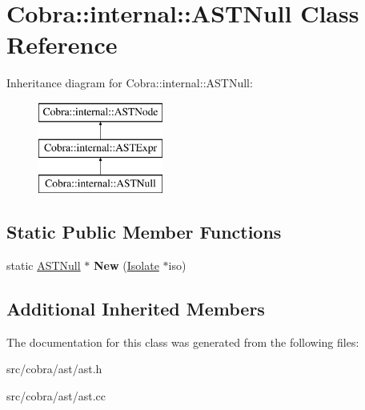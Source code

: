 \hypertarget{class_cobra_1_1internal_1_1_a_s_t_null}{\section{Cobra\+:\+:internal\+:\+:A\+S\+T\+Null Class Reference}
\label{class_cobra_1_1internal_1_1_a_s_t_null}
}
Inheritance diagram for Cobra\+:\+:internal\+:\+:A\+S\+T\+Null\+:\begin{figure}[H]
\begin{center}
\leavevmode
\includegraphics[height=3.000000cm]{class_cobra_1_1internal_1_1_a_s_t_null}
\end{center}
\end{figure}
\subsection*{Static Public Member Functions}
\begin{DoxyCompactItemize}
\item 
\hypertarget{class_cobra_1_1internal_1_1_a_s_t_null_aad52055b58331ec803f10dd00ba147a0}{static \hyperlink{class_cobra_1_1internal_1_1_a_s_t_null}{A\+S\+T\+Null} $\ast$ {\bfseries New} (\hyperlink{class_cobra_1_1internal_1_1_isolate}{Isolate} $\ast$iso)}\label{class_cobra_1_1internal_1_1_a_s_t_null_aad52055b58331ec803f10dd00ba147a0}

\end{DoxyCompactItemize}
\subsection*{Additional Inherited Members}


The documentation for this class was generated from the following files\+:\begin{DoxyCompactItemize}
\item 
src/cobra/ast/ast.\+h\item 
src/cobra/ast/ast.\+cc\end{DoxyCompactItemize}
